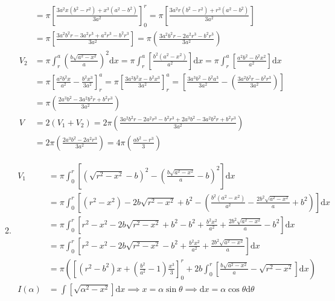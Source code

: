 \documentclass[12pt, A4]{report}
\renewcommand{\d}{\text{d}}
\begin{document}
\begin{enumerate}
\begin{enumerate}
\begin{align*}
									&= \pi\left[\frac{3a^2x(b^2 - r^2) + x^3(a^2 - b^2)}{3a^2}\right]_0^r
										= \pi\left[\frac{3a^2r(b^2 - r^2) + r^3(a^2 - b^2)}{3a^2}\right] \\
									&= \pi\left[\frac{3a^2b^2r - 3a^2r^3 + a^2r^3 - b^2r^3}{3a^2}\right]
										= \pi\left(\frac{3a^2b^2r - 2a^2r^3 - b^2r^3}{3a^2}\right) \\
								V_2 &= \pi\int_r^a\left(\frac{b\sqrt{a^2 - x^2}}{a}\right)^2\d x
										= \pi\int_r^a\left[\frac{b^2(a^2 - x^2)}{a^2}\right]\d x  = \pi\int_r^a\left[\frac{a^2b^2 - b^2x^2}{a^2}\right]\d x \\
									&= \pi\left[\frac{a^2b^2x}{a^2} - \frac{b^2x^3}{3a^2}\right]_r^a 
										= \pi\left[\frac{3a^2b^2x - b^2x^3}{3a^2}\right]_r^a 
										= \left[\frac{3a^3b^2 - b^2a^3}{3a^2} - \left(\frac{3a^2b^2r -b^2r^3}{3a^2}\right)\right] \\
									&= \pi\left(\frac{2a^3b^2 -3a^2b^2r + b^2r^3}{3a^2}\right) \\
								V &= 2(V_1 + V_2)
										= 2\pi\left(\frac{3a^2b^2r - 2a^2r^3 - b^2r^3 + 2a^3b^2 - 3a^2b^2r + b^2r^3}{3a^2}\right) \\
									&= 2\pi\left(\frac{2a^3b^2 - 2a^2r^3}{3a^2}\right) 
										= 4\pi\left(\frac{ab^2 - r^3}{3}\right)
							\end{align*}
						\item
 							\begin{align*}
								V_1 &= \pi\int_0^r\left[\left(\sqrt{r^2 - x^2} - b\right)^2 - \left(\frac{b\sqrt{a^2 - x^2}}{a} - b\right)^2\right]\d x \\
									&= \pi\int_0^r\left[(r^2 - x^2) - 2b\sqrt{r^2 - x^2} + b^2 - \left(\frac{b^2(a^2 - x^2)}{a^2} -\frac{2b^2\sqrt{a^2 - x^2}}{a} + b^2\right)\right]\d x \\
									&= \pi\int_0^r\left[r^2 - x^2 - 2b\sqrt{r^2 - x^2} + b^2 - b^2 +  \frac{b^2x^2}{a^2} + \frac{2b^2\sqrt{a^2 - x^2}}{a} - b^2\right]\d x \\
									&= \pi\int_0^r\left[r^2 - x^2 - 2b\sqrt{r^2 - x^2} - b^2 + \frac{b^2x^2}{a^2} + \frac{2b^2\sqrt{a^2 - x^2}}{a}\right]\d x \\
									&= \pi\left(\left[(r^2 - b^2)x + \left(\frac{b^2}{a^2} - 1 \right)\frac{x^3}{3}\right]_0^r + 2b\int_0^r\left[ \frac{b\sqrt{a^2 - x^2}}{a} - \sqrt{r^2 - x^2}\right]\d x\right) \\
								I(\alpha) &= \int\left[\sqrt{\alpha^2 - x^2}\right]\d x 
										\implies x = \alpha\sin\theta 
										\implies \d x = \alpha\cos\theta\d\theta \\

\end{align*}
\end{enumerate}
\end{enumerate}
\end{document}
